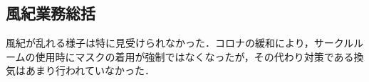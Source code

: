\subsection*{風紀業務総括}

風紀が乱れる様子は特に見受けられなかった．コロナの緩和により，サークルルームの使用時にマスクの着用が強制ではなくなったが，その代わり対策である換気はあまり行われていなかった．
